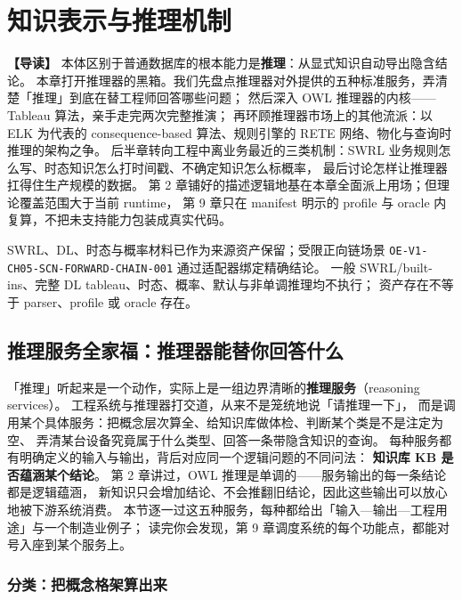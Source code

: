 \chapter{知识表示与推理机制}

\begin{introbox}
\textbf{【导读】}
本体区别于普通数据库的根本能力是\textbf{推理}：从显式知识自动导出隐含结论。
本章打开推理器的黑箱。我们先盘点推理器对外提供的五种标准服务，弄清楚「推理」到底在替工程师回答哪些问题；
然后深入 OWL 推理器的内核——Tableau 算法，亲手走完两次完整推演；
再环顾推理器市场上的其他流派：以 ELK 为代表的 consequence-based 算法、规则引擎的 RETE 网络、物化与查询时推理的架构之争。
后半章转向工程中离业务最近的三类机制：SWRL 业务规则怎么写、时态知识怎么打时间戳、不确定知识怎么标概率，
最后讨论怎样让推理器扛得住生产规模的数据。
第 2 章铺好的描述逻辑地基在本章全面派上用场；但理论覆盖范围大于当前 runtime，
第 9 章只在 manifest 明示的 profile 与 oracle 内复算，不把未支持能力包装成真实代码。
\end{introbox}

{SWRL、DL、时态与概率材料已作为来源资产保留；受限正向链场景
\texttt{OE-V1-CH05-SCN-FORWARD-CHAIN-001} 通过适配器绑定精确结论。}
{一般 SWRL/built-ins、完整 DL tableau、时态、概率、默认与非单调推理均不执行；
资产存在不等于 parser、profile 或 oracle 存在。}

\section{推理服务全家福：推理器能替你回答什么}

「推理」听起来是一个动作，实际上是一组边界清晰的\textbf{推理服务}（reasoning services）。
工程系统与推理器打交道，从来不是笼统地说「请推理一下」，
而是调用某个具体服务：把概念层次算全、给知识库做体检、判断某个类是不是注定为空、
弄清某台设备究竟属于什么类型、回答一条带隐含知识的查询。
每种服务都有明确定义的输入与输出，背后对应同一个逻辑问题的不同问法：
\textbf{知识库 KB 是否蕴涵某个结论}。
第 2 章讲过，OWL 推理是单调的——服务输出的每一条结论都是逻辑蕴涵，
新知识只会增加结论、不会推翻旧结论，因此这些输出可以放心地被下游系统消费。
本节逐一过这五种服务，每种都给出「输入—输出—工程用途」与一个制造业例子；
读完你会发现，第 9 章调度系统的每个功能点，都能对号入座到某个服务上。

\subsection{分类：把概念格架算出来}

